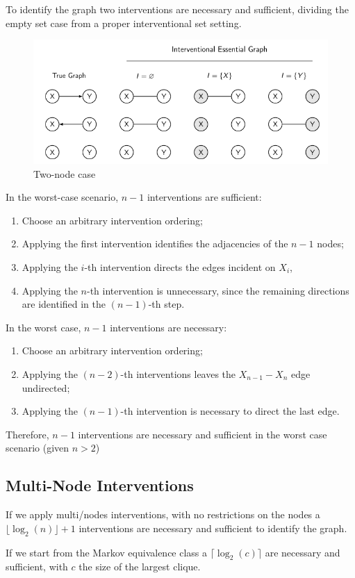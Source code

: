 To identify the graph two interventions are necessary and sufficient,
dividing the empty set case from a proper interventional set setting.

\begin{figure}[!ht]
    \centering
    \includegraphics[width=\textwidth]{img/causal_discovery/twonodecase.png}
    \caption{Two-node case}
    \label{fig:twonodecase}
\end{figure}

In the worst-case scenario, $n- 1$ interventions are sufficient:
\begin{enumerate}
    \item Choose an arbitrary intervention ordering;
    \item Applying the first intervention identifies the adjacencies of the $n - 1$
          nodes;
    \item Applying the $i$-th intervention directs the edges incident on $X_i$,
    \item Applying the $n$-th intervention is unnecessary, since the remaining
          directions are identified in the $(n-1)$-th step.
\end{enumerate}
In the worst case, $n-1$ interventions are necessary:
\begin{enumerate}
    \item Choose an arbitrary intervention ordering;
    \item Applying the $(n-2)$-th interventions leaves the $X_{n - 1} - X_n$ edge
          undirected;
    \item Applying the $(n-1)$-th intervention is necessary to direct the last
          edge.
\end{enumerate}
Therefore, $n-1$ interventions are necessary and sufficient in the worst case
scenario (given $n > 2$)
\subsection{Multi-Node Interventions}
If we apply multi/nodes interventions, with no restrictions on the nodes a
$\lfloor \log_2(n) \rfloor + 1$ interventions are necessary and sufficient to
identify the graph.

If we start from the Markov equivalence class a $\lceil \log_2(c) \rceil$ are
necessary and sufficient, with $c$ the size of the largest clique.
